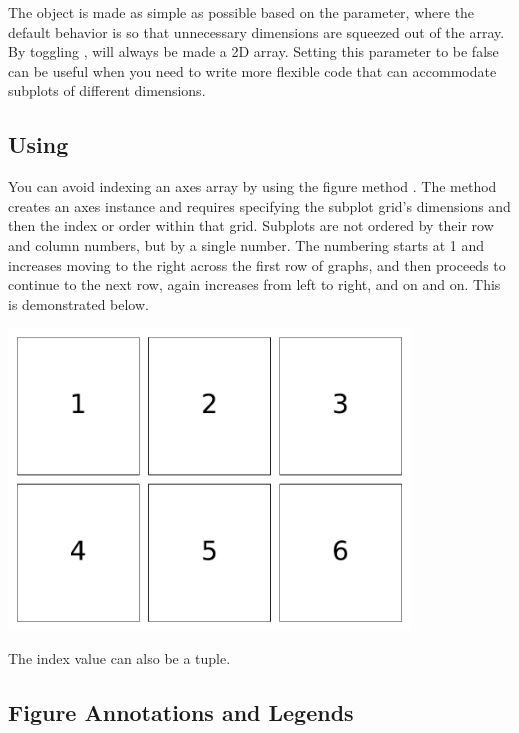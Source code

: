 The  object is made as simple as possible based on the  parameter, where the default behavior is  so that unnecessary dimensions are squeezed out of the array. By toggling ,  will always be made a 2D array. Setting this parameter to be false can be useful when you need to write more flexible code that can accommodate subplots of different dimensions. 


\subsection{Using }

You can avoid indexing an axes array by using the figure method . The method creates an axes instance and requires specifying the subplot grid's dimensions and then the index or order within that grid. Subplots are not ordered by their row and column numbers, but by a single number. The numbering starts at 1 and increases moving to the right across the first row of graphs, and then proceeds to continue to the next row, again increases from left to right, and on and on. This is demonstrated below. 


\begin{center}
    \includegraphics[width = 0.8\textwidth]{figures/proseplots/add-subplot.pdf}
\end{center}

The index value can also be a tuple. 


\subsection{Figure Annotations and Legends}

